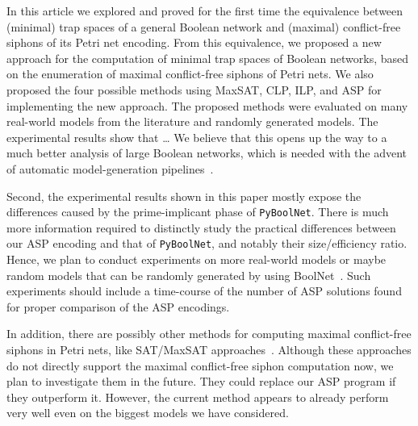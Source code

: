 \documentclass[preprint,12pt]{elsarticle}
\begin{document}
In this article we explored and proved for the first time the equivalence between (minimal) trap spaces of a general Boolean network and (maximal) conflict-free siphons of its Petri net encoding.
From this equivalence, we proposed a new approach for the computation of minimal trap spaces of Boolean networks, based on the enumeration of maximal conflict-free siphons of Petri nets.
We also proposed the four possible methods using MaxSAT, CLP, ILP, and ASP for implementing the new approach.
The proposed methods were evaluated on many real-world models from the literature and randomly generated models.
The experimental results show that \dots
We believe that this opens up the way to a much better analysis of large Boolean networks, which is needed with the advent of automatic model-generation pipelines~\cite{ostaszewski2021covid19}.


Second, the experimental results shown in this paper mostly expose the differences caused by the prime-implicant phase of \texttt{PyBoolNet}. There is much more information required to distinctly study the practical differences between our ASP encoding and that of \texttt{PyBoolNet}, and notably their size/efficiency ratio.
Hence, we plan to conduct experiments on more real-world models or maybe random models that can be randomly generated by using BoolNet~\cite{mussel2010boolnet}.
Such experiments should include a time-course of the number of ASP solutions found for proper comparison of the ASP encodings.

In addition, there are possibly other methods for computing maximal conflict-free siphons in Petri nets, like SAT/MaxSAT approaches~\cite{nabli2016enumerating}. Although these approaches do not directly support the maximal conflict-free siphon computation now, we plan to investigate them in the future. They could replace our ASP program if they outperform it.
However, the current method appears to already perform very well even on the biggest models we have considered.
\end{document}

